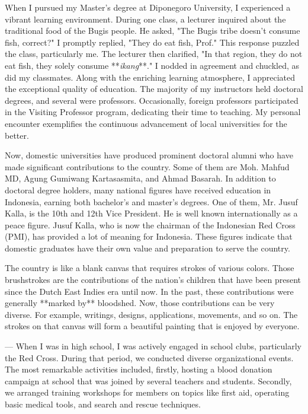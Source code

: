 \documentclass[../main.tex]{subfiles}
\begin{document}
When I pursued my Master's degree at Diponegoro University, I experienced a vibrant learning environment. During one class, a lecturer inquired about the traditional food of the Bugis people. He asked, "The Bugis tribe doesn't consume fish, correct?" I promptly replied, "They do eat fish, Prof." This response puzzled the class, particularly me. The lecturer then clarified, "In that region, they do not eat fish, they solely consume **\textit{ikang}**." I nodded in agreement and chuckled, as did my classmates. Along with the enriching learning atmosphere, I appreciated the exceptional quality of education. The majority of my instructors held doctoral degrees, and several were professors. Occasionally, foreign professors participated in the Visiting Professor program, dedicating their time to teaching. My personal encounter exemplifies the continuous advancement of local universities for the better.

Now, domestic universities have produced prominent doctoral alumni who have made significant contributions to the country. Some of them are Moh. Mahfud MD, Agung Gumiwang Kartasasmita, and Ahmad Basarah. In addition to doctoral degree holders, many national figures have received education in Indonesia, earning both bachelor's and master's degrees. One of them, Mr. Jusuf Kalla, is the 10th and 12th Vice President. He is well known internationally as a peace figure. Jusuf Kalla, who is now the chairman of the Indonesian Red Cross (PMI), has provided a lot of meaning for Indonesia. These figures indicate that domestic graduates have their own value and preparation to serve the country.

The country is like a blank canvas that requires strokes of various colors. Those brushstrokes are the contributions of the nation's children that have been present since the Dutch East Indies era until now. In the past, these contributions were generally **marked by** bloodshed. Now, those contributions can be very diverse. For example, writings, designs, applications, movements, and so on. The strokes on that canvas will form a beautiful painting that is enjoyed by everyone.

---
When I was in high school, I was actively engaged in school clubs, particularly the Red Cross. During that period, we conducted diverse organizational events. The most remarkable activities included, firstly, hosting a blood donation campaign at school that was joined by several teachers and students. Secondly, we arranged training workshops for members on topics like first aid, operating basic medical tools, and search and rescue techniques.
\end{document}

